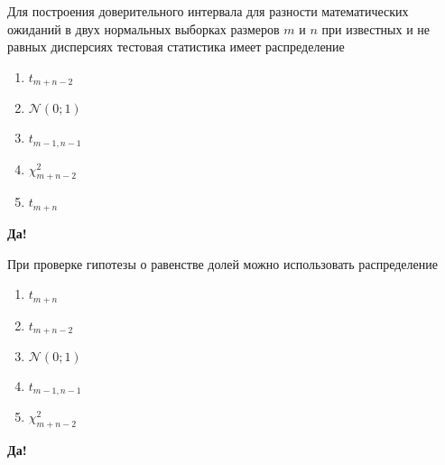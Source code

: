 \documentclass[t]{beamer}
\newcommand{\cN}{\mathcal{N}}
\begin{document}
 \begin{frame} \label{5-Yes} 
\begin{block}{5} 

  Для построения доверительного интервала для разности математических ожиданий в двух нормальных выборках размеров $m$ и $n$ при известных и не равных дисперсиях тестовая статистика имеет распределение


 \end{block} 
\begin{enumerate} 
\item[] \hyperlink{5-No}{\beamergotobutton{} $t_{m+n-2}$}
\item[] \hyperlink{5-Yes}{\beamergotobutton{} $\cN(0;1)$}
\item[] \hyperlink{5-No}{\beamergotobutton{} $t_{m-1,n-1}$}
\item[] \hyperlink{5-No}{\beamergotobutton{} $\chi^2_{m+n-2}$}
\item[] \hyperlink{5-No}{\beamergotobutton{} $t_{m+n}$}
\end{enumerate} 

 \textbf{Да!} 
 \hyperlink{6}{}\end{frame} 


 \begin{frame} \label{6-Yes} 
\begin{block}{6} 

  При проверке гипотезы о равенстве долей можно использовать распределение


 \end{block} 
\begin{enumerate} 
\item[] \hyperlink{6-No}{\beamergotobutton{} $t_{m+n}$}
\item[] \hyperlink{6-No}{\beamergotobutton{} $t_{m+n-2}$}
\item[] \hyperlink{6-Yes}{\beamergotobutton{} $\cN(0;1)$}
\item[] \hyperlink{6-No}{\beamergotobutton{} $t_{m-1,n-1}$}
\item[] \hyperlink{6-No}{\beamergotobutton{} $\chi^2_{m+n-2}$}
\end{enumerate} 

 \textbf{Да!} 
 \hyperlink{7}{}\end{frame} 
\end{document}
